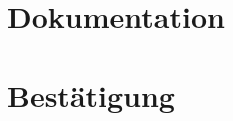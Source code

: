\documentclass[a4paper,11pt,titlepage,twoside]{memoir}
\begin{document}
\section{Dokumentation}
\label{sec:org5967deb}

\section{Bestätigung}
\label{sec:orgac286d0}

\end{document}
